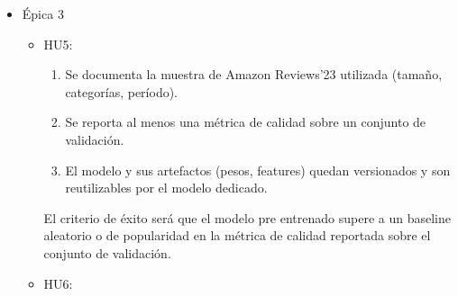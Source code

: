 \documentclass[
11pt, %
]{charter}
\begin{document}
\begin{itemize}
\begin{itemize}
\begin{enumerate}[label=(\alph*)]
          \item Cada ítem recomendado incluye la traza de qué señal(es) contribuyeron a su score.
          \item El ranking no repite ítems ya comprados o reseñados por el usuario, salvo que se solicite explícitamente.
        \end{enumerate}
        El criterio de éxito será que el ranking híbrido obtenga una métrica de calidad superior a la de cualquiera de las tres señales evaluadas de forma aislada. Por ejemplo, mejor precisión de clasificación (precision@10) o mejor NDCG@10.
      \item HU4:
        \begin{enumerate}[label=(\alph*)]
          \item Cada recomendación devuelta incluye un score de confianza numérico en un rango definido. Un buen rango es $[0,1]$ ya que está normalizado y facilita comparar recomendaciones entre sí.
          \item El score decrece de forma consistente ante menor evidencia disponible, como sería en el caso de un usuario nuevo.
          \item Existe un umbral configurable por debajo del que la recomendación puede omitirse.
        \end{enumerate}
        El criterio de éxito será que aplicar el umbral de confianza reduzca la proporción de recomendaciones de baja relevancia sin descartar más del 20\% de las recomendaciones totales.
    \end{itemize}
  \item \'{E}pica 3
    \begin{itemize}
      \item HU5:
        \begin{enumerate}[label=(\alph*)]
          \item Se documenta la muestra de Amazon Reviews'23 utilizada (tamaño, categorías, período).
          \item Se reporta al menos una métrica de calidad sobre un conjunto de validación.
          \item El modelo y sus artefactos (pesos, features) quedan versionados y son reutilizables por el modelo dedicado.
        \end{enumerate}
        El criterio de éxito será que el modelo pre entrenado supere a un baseline aleatorio o de popularidad en la métrica de calidad reportada sobre el conjunto de validación.
      \item HU6:
        \begin{enumerate}[label=(\alph*)]

\end{enumerate}
\end{itemize}
\end{itemize}
\end{document}
